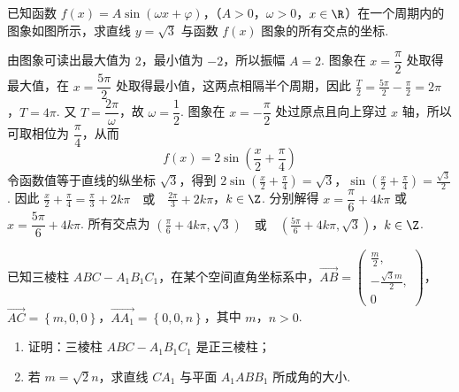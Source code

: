\begin{problem}
已知函数 \( f(x) = A \sin (\omega x + \varphi) \)，（\(A > 0\)，\(\omega > 0\)，\(x \in \R\)）在一个周期内的图象如图所示，求直线 \( y = \sqrt{3} \) 与函数 \( f(x) \) 图象的所有交点的坐标.

\end{problem}

\begin{solution}
由图象可读出最大值为 \(2\)，最小值为 \(-2\)，所以振幅 \(A=2\). 图象在 \(x=\dfrac{\pi}{2}\) 处取得最大值，在 \(x=\dfrac{5\pi}{2}\) 处取得最小值，这两点相隔半个周期，因此
\(\frac{T}{2}=\frac{5\pi}{2}-\frac{\pi}{2}=2\pi\)，\(T=4\pi\).
又 \(T=\dfrac{2\pi}{\omega}\)，故 \(\omega=\dfrac{1}{2}\). 图象在 \(x=-\dfrac{\pi}{2}\) 处过原点且向上穿过 \(x\) 轴，所以可取相位为 \(\dfrac{\pi}{4}\)，从而
\[
f(x)=2\sin\left(\frac{x}{2}+\frac{\pi}{4}\right)
\]
令函数值等于直线的纵坐标 \(\sqrt{3}\)，得到
\(2\sin\left(\frac{x}{2}+\frac{\pi}{4}\right)=\sqrt{3}\)，\(\sin\left(\frac{x}{2}+\frac{\pi}{4}\right)=\frac{\sqrt{3}}{2}\).
因此
\(\frac{x}{2}+\frac{\pi}{4}=\frac{\pi}{3}+2k\pi \quad\text{或}\quad \frac{2\pi}{3}+2k\pi\)，\(k\in\Z\).
分别解得 \(x=\dfrac{\pi}{6}+4k\pi\) 或 \(x=\dfrac{5\pi}{6}+4k\pi\). 所有交点为
\(\left(\frac{\pi}{6}+4k\pi,\sqrt{3}\right) \quad\text{或}\quad \left(\frac{5\pi}{6}+4k\pi,\sqrt{3}\right)\)，\(k\in\Z\).
\end{solution}

\begin{problem}
已知三棱柱 \(ABC - A_{1}B_{1}C_{1}\)，在某个空间直角坐标系中，\(\overrightarrow{AB}=\begin{pmatrix}
\frac{m}{2},\\
-\frac{\sqrt{3}m}{2},\\
0
\end{pmatrix}\)，\(\overrightarrow{AC}=\left\{m,0,0\right\}\)，\(\overrightarrow{AA_1}=\left\{0,0,n\right\}\)，其中 \(m\)，\(n>0\).

\begin{enumerate}
\item 证明：三棱柱 \(ABC - A_{1}B_{1}C_{1}\) 是正三棱柱；
\item 若 \(m = \sqrt{2}n\)，求直线 \(CA_{1}\) 与平面 \(A_{1}ABB_{1}\) 所成角的大小.
\end{enumerate}

\end{problem}

